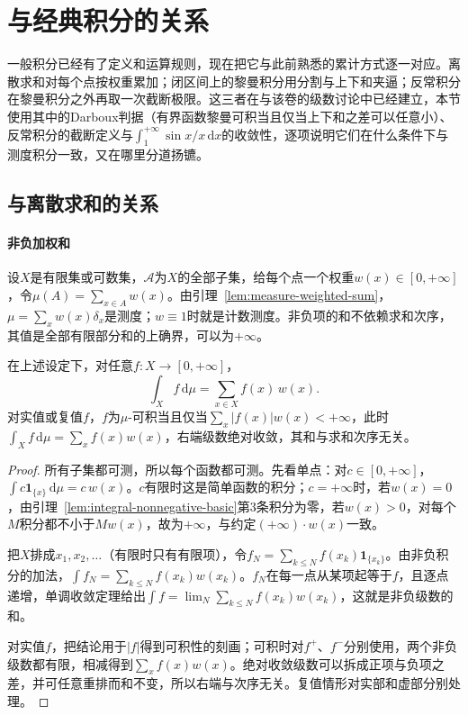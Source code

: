 \section{与经典积分的关系}
\label{sec:integral-classical}

一般积分已经有了定义和运算规则，现在把它与此前熟悉的累计方式逐一对应。离散求和对每个点按权重累加；闭区间上的黎曼积分用分割与上下和夹逼；反常积分在黎曼积分之外再取一次截断极限。这三者在与该卷的级数讨论中已经建立，本节使用其中的Darboux判据（有界函数黎曼可积当且仅当上下和之差可以任意小）、反常积分的截断定义与$\int_1^{+\infty}\sin x/x\,\mathrm dx$的收敛性，逐项说明它们在什么条件下与测度积分一致，又在哪里分道扬镳。

\subsection{与离散求和的关系}
\label{sec:integral-discrete-sums}

\paragraph{非负加权和}
设$X$是有限集或可数集，$\mathcal A$为$X$的全部子集，给每个点一个权重$w(x)\in[0,+\infty]$，令$\mu(A)=\sum_{x\in A}w(x)$。由引理~\ref{lem:measure-weighted-sum}，$\mu=\sum_xw(x)\delta_x$是测度；$w\equiv1$时就是计数测度。非负项的和不依赖求和次序，其值是全部有限部分和的上确界，可以为$+\infty$。

\begin{theorem}[离散测度上的积分即加权和]
\label{thm:integral-discrete-sum}
在上述设定下，对任意$f:X\to[0,+\infty]$，
\[
 \int_Xf\,\mathrm d\mu=\sum_{x\in X}f(x)\,w(x).
\]
对实值或复值$f$，$f$为$\mu$-可积当且仅当$\sum_x|f(x)|w(x)<+\infty$，此时$\int_Xf\,\mathrm d\mu=\sum_xf(x)w(x)$，右端级数绝对收敛，其和与求和次序无关。
\end{theorem}

\begin{proof}
所有子集都可测，所以每个函数都可测。先看单点：对$c\in[0,+\infty]$，$\int c\mathbf 1_{\{x\}}\,\mathrm d\mu=c\,w(x)$。$c$有限时这是简单函数的积分；$c=+\infty$时，若$w(x)=0$，由引理~\ref{lem:integral-nonnegative-basic}第3条积分为零，若$w(x)>0$，对每个$M$积分都不小于$Mw(x)$，故为$+\infty$，与约定$(+\infty)\cdot w(x)$一致。

把$X$排成$x_1,x_2,\dots$（有限时只有有限项），令$f_N=\sum_{k\le N}f(x_k)\mathbf 1_{\{x_k\}}$。由非负积分的加法，$\int f_N=\sum_{k\le N}f(x_k)w(x_k)$。$f_N$在每一点从某项起等于$f$，且逐点递增，单调收敛定理给出$\int f=\lim_N\sum_{k\le N}f(x_k)w(x_k)$，这就是非负级数的和。

对实值$f$，把结论用于$|f|$得到可积性的刻画；可积时对$f^+$、$f^-$分别使用，两个非负级数都有限，相减得到$\sum_xf(x)w(x)$。绝对收敛级数可以拆成正项与负项之差，并可任意重排而和不变，所以右端与次序无关。复值情形对实部和虚部分别处理。
\end{proof}

